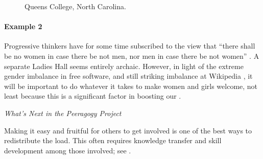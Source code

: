 \begin{refsection}
\begin{figure}
{\par}
\caption{Queens College, North Carolina.
\label{ladies-hall}}
\end{figure}


\paragraph{Example 2}
Progressive thinkers have for some time subscribed to the view that
``there shall be no women in case there be not men, nor men in case
there be not women'' \cite[Chapter 1.LII]{rabelais1894gargantua}.  A
separate Ladies Hall seems entirely archaic.  However, in light of the
extreme gender imbalance in free software, and still striking
imbalance at Wikipedia \cite{gender,FM4291}, it will be important to
do whatever it takes to make women and girls welcome, not least
because this is a significant factor in boosting our
.


\begin{framed}
\noindent 
\emph{What's Next in the Peeragogy Project}
\begin{collectinmacro}{\CarryingWN}{}{}
Making it easy and fruitful for others to get involved is one of the best ways to redistribute the load.  This often requires knowledge transfer and skill development among those involved; see .
\end{collectinmacro}
\CarryingWN
\end{framed}

\printbibliography[heading=subbibliography]
\end{refsection}
